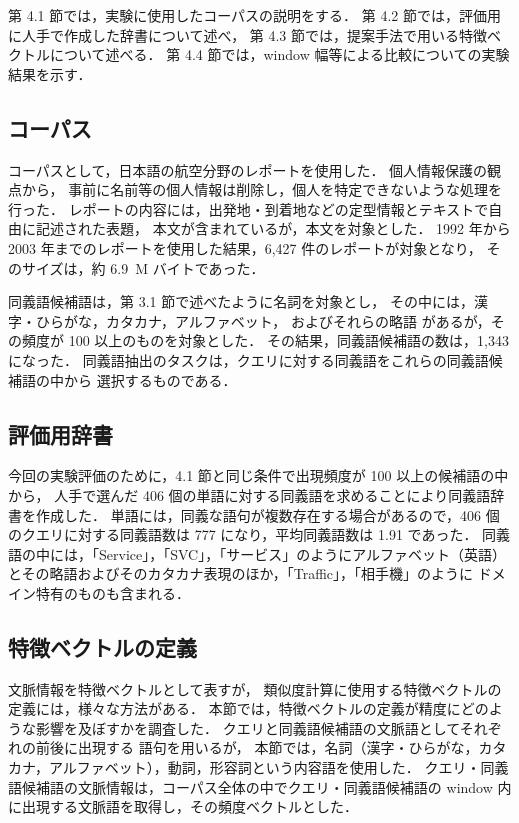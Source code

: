 \documentclass[japanese]{jnlp_1.4}
\begin{document}
第 4.1 節では，実験に使用したコーパスの説明をする．
第 4.2 節では，評価用に人手で作成した辞書について述べ，
第 4.3 節では，提案手法で用いる特徴ベクトルについて述べる．
第 4.4 節では，window 幅等による比較についての実験結果を示す．

\subsection{コーパス}

コーパスとして，日本語の航空分野のレポートを使用した．
個人情報保護の観点から，
事前に名前等の個人情報は削除し，個人を特定できないような処理を行った．
レポートの内容には，出発地・到着地などの定型情報とテキストで自由に記述された表題，
本文が含まれているが，本文を対象とした．
1992 年から 2003 年までのレポートを使用した結果，6,427 件のレポートが対象となり，
そのサイズは，約 6.9~M バイトであった．

同義語候補語は，第 3.1 節で述べたように名詞を対象とし，
その中には，漢字・ひらがな，カタカナ，アルファベット，
およびそれらの略語
があるが，その頻度が 100 以上のものを対象とした．
その結果，同義語候補語の数は，1,343 になった．
同義語抽出のタスクは，クエリに対する同義語をこれらの同義語候補語の中から
選択するものである．


\subsection{評価用辞書}

今回の実験評価のために，4.1 節と同じ条件で出現頻度が 100 以上の候補語の中から，
人手で選んだ 406 個の単語に対する同義語を求めることにより同義語辞書を作成した．
単語には，同義な語句が複数存在する場合があるので，406 個のクエリに対する同義語数は 777 になり，平均同義語数は 1.91 であった．
同義語の中には，「Service」，「SVC」，「サービス」のようにアルファベット（英語）
とその略語およびそのカタカナ表現のほか，「Traffic」，「相手機」のように
ドメイン特有のものも含まれる．


\subsection{特徴ベクトルの定義}
\label{subsec:文脈語の重み付けによる比較}

文脈情報を特徴ベクトルとして表すが，
類似度計算に使用する特徴ベクトルの定義には，様々な方法がある．
本節では，特徴ベクトルの定義が精度にどのような影響を及ぼすかを調査した．
クエリと同義語候補語の文脈語としてそれぞれの前後に出現する
語句を用いるが，
本節では，名詞（漢字・ひらがな，カタカナ，アルファベット），動詞，形容詞という内容語を使用した．
クエリ・同義語候補語の文脈情報は，コーパス全体の中でクエリ・同義語候補語の window 内に出現する文脈語を取得し，その頻度ベクトルとした．
\end{document}
